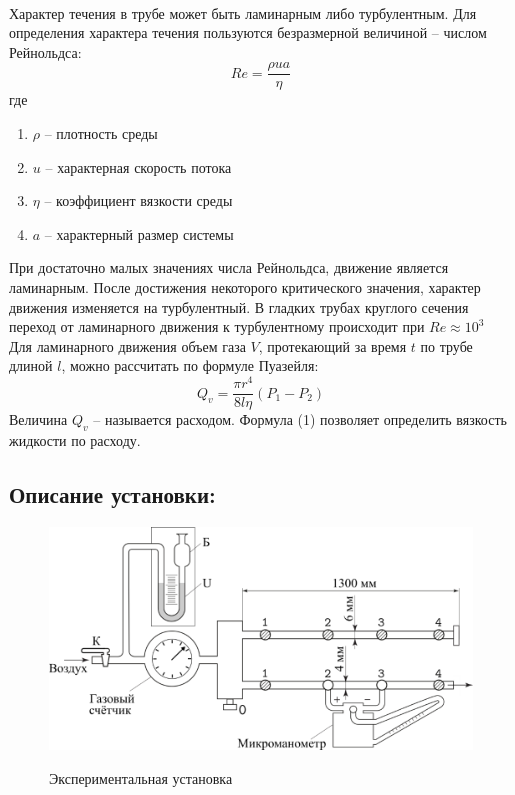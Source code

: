 \documentclass[a4paper,12pt]{article}
\begin{document}
\paragraph{}
Характер течения в трубе может быть ламинарным либо турбулентным. Для определения характера течения пользуются безразмерной величиной -- числом Рейнольдса:
\[
Re = \frac{\rho ua}{\eta}
\]
где 
\begin{enumerate}
\itemsep0em
\item 
$\rho$ -- плотность среды 
\item
$u$ -- характерная скорость потока
\item 
$\eta$ -- коэффициент вязкости среды
\item 
$a$ -- характерный размер системы 
\end{enumerate}
При достаточно малых значениях числа Рейнольдса, движение является ламинарным. После достижения некоторого критического значения, характер движения изменяется на турбулентный. В гладких трубах круглого сечения переход от ламинарного движения к турбулентному происходит при $Re \approx 10^3$\\
Для ламинарного движения объем газа $V$, протекающий за время $t$ по трубе длиной $l$, можно рассчитать по формуле Пуазейля:
\begin{equation}
Q_v = \frac{\pi r^4}{8l \eta}(P_1-P_2)
\end{equation}
Величина $Q_v$ -- называется расходом. Формула (1) позволяет определить вязкость жидкости по расходу.
\subsection{Описание установки:}
\begin{figure}
\centering
\includegraphics[width=0.7\linewidth]{setup.png}
\label{fig:setup}
\caption{Экспериментальная установка}
\end{figure}
\end{document}
